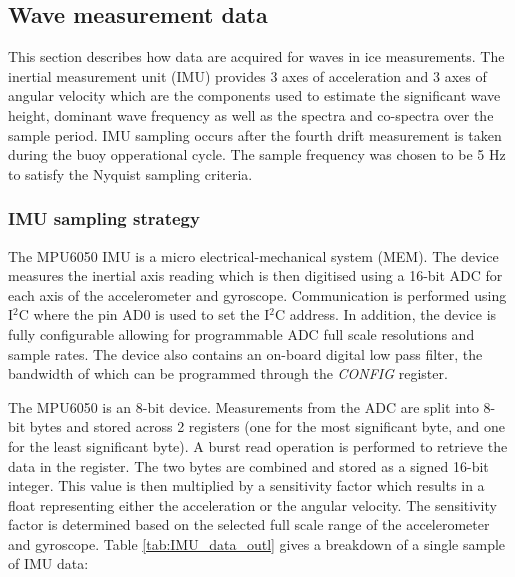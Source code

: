 \subsection{Wave measurement data}

This section describes how data are acquired for waves in ice measurements. The inertial measurement unit (IMU) provides 3 axes of acceleration and 3 axes of angular velocity which are the components used to estimate the significant wave height, dominant wave frequency as well as the spectra and co-spectra over the sample period. IMU sampling occurs after the fourth drift measurement is taken  during the buoy opperational cycle. The sample frequency was chosen to be 5 Hz to satisfy the Nyquist sampling criteria.\par 

\subsubsection{IMU sampling strategy}

The MPU6050 IMU is a micro electrical-mechanical system (MEM). The device measures the inertial axis reading which is then digitised using a 16-bit ADC for each axis of the accelerometer and gyroscope. Communication is performed using I$^2$C where the pin AD0 is used to set the I$^2$C address. In addition, the device is fully configurable allowing for programmable ADC full scale resolutions and sample rates. The device also contains an on-board digital low pass filter, the bandwidth of which can be programmed through the \textit{CONFIG} register.\par 

The MPU6050 is an 8-bit device. Measurements from the ADC are split into 8-bit bytes and stored across 2 registers (one for the most significant byte, and one for the least significant byte). A burst read operation is performed to retrieve the data in the register. The two bytes are combined and stored as a signed 16-bit integer. This value is then multiplied by a sensitivity factor which results in a float representing either the acceleration or the angular velocity. The sensitivity factor is determined based on the selected full scale range of the accelerometer and gyroscope. Table \ref{tab:IMU_data_outl} gives a breakdown of a single sample of IMU data:

